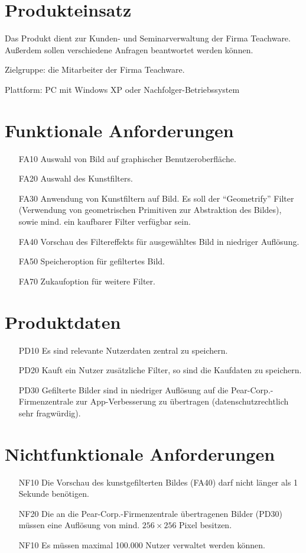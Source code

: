 \documentclass[parskip=full]{scrartcl}
\begin{document}
\section{Produkteinsatz}
Das Produkt dient zur Kunden- und Seminarverwaltung der Firma Teachware. Außerdem sollen verschiedene Anfragen beantwortet werden können.

Zielgruppe: die Mitarbeiter der Firma Teachware.

Plattform: PC mit Windows XP oder Nachfolger-Betriebssystem

\section{Funktionale Anforderungen}
\begin{itemize}[nosep]
  \item[FA10] Auswahl von Bild auf graphischer Benutzeroberfl\"ache.
  \item[FA20] Auswahl des Kunstfilters.
  \item[FA30] Anwendung von Kunstfiltern auf Bild. Es soll der ``Geometrify'' Filter (Verwendung von geometrischen Primitiven zur Abstraktion des Bildes), sowie mind. ein kaufbarer Filter verf\"ugbar sein.
  \item[FA40] Vorschau des Filtereffekts f\"ur ausgew\"ahltes Bild in niedriger Aufl\"osung.
  \item[FA50] Speicheroption f\"ur gefiltertes Bild.
  \item[FA70] Zukaufoption f\"ur weitere Filter.
\end{itemize}


\section{Produktdaten}
\begin{itemize}[nosep]
\item[PD10] Es sind relevante Nutzerdaten zentral zu speichern.
\item[PD20] Kauft ein Nutzer zus\"atzliche Filter, so sind die Kaufdaten zu speichern.
\item[PD30] Gefilterte Bilder sind in niedriger Aufl\"osung auf die Pear-Corp.-Firmenzentrale zur App-Verbesserung zu \"ubertragen (datenschutzrechtlich sehr fragw\"urdig).
\end{itemize}

\section{Nichtfunktionale Anforderungen}
\begin{itemize}[nosep]
\item[NF10] Die Vorschau des kunstgefilterten Bildes (FA40) darf nicht l\"anger als 1 Sekunde ben\"otigen.
\item[NF20] Die an die Pear-Corp.-Firmenzentrale \"ubertragenen Bilder (PD30) m\"ussen eine Aufl\"osung von mind. $256\times 256$ Pixel besitzen. 
\item[NF10] Es m\"ussen maximal 100.000 Nutzer verwaltet werden k\"onnen.
\end{itemize}
\end{document}
